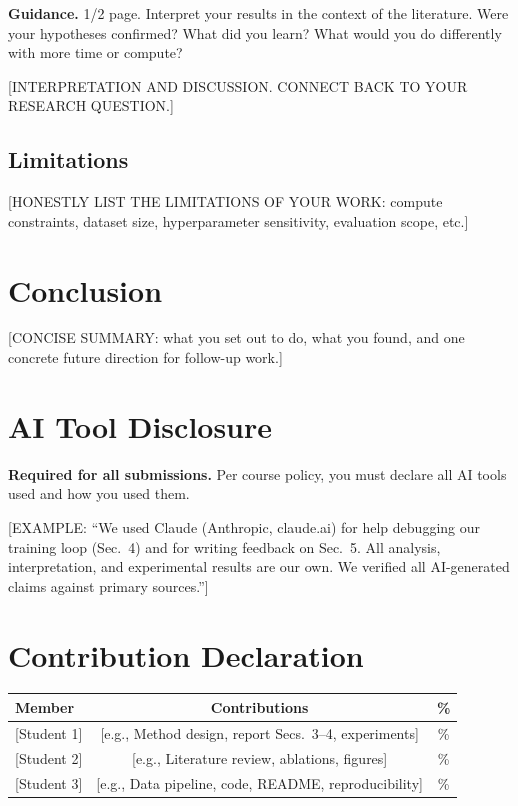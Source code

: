 \documentclass[11pt, letterpaper]{article}
\begin{document}
\begin{guidancebox}
\textbf{Guidance.} 1/2 page. Interpret your results in the context of the
literature. Were your hypotheses confirmed? What did you learn?
What would you do differently with more time or compute?
\end{guidancebox}

[INTERPRETATION AND DISCUSSION. CONNECT BACK TO YOUR RESEARCH QUESTION.]

\subsection{Limitations}

[HONESTLY LIST THE LIMITATIONS OF YOUR WORK: compute constraints, dataset
size, hyperparameter sensitivity, evaluation scope, etc.]

\section{Conclusion}

[CONCISE SUMMARY: what you set out to do, what you found, and one concrete
future direction for follow-up work.]

\section{AI Tool Disclosure}

\begin{guidancebox}
\textbf{Required for all submissions.} Per course policy, you must declare
all AI tools used and how you used them.
\end{guidancebox}

[EXAMPLE: ``We used Claude (Anthropic, claude.ai) for help debugging our
training loop (Sec.~4) and for writing feedback on Sec.~5. All analysis,
interpretation, and experimental results are our own. We verified all
AI-generated claims against primary sources.'']

\section{Contribution Declaration}

\begin{tabular}{lcc}
\toprule
\textbf{Member} & \textbf{Contributions} & \textbf{\%} \\
\midrule
{[Student 1]} & [e.g., Method design, report Secs.~3--4, experiments] & \% \\
{[Student 2]} & [e.g., Literature review, ablations, figures] & \% \\
{[Student 3]} & [e.g., Data pipeline, code, README, reproducibility] & \% \\
\bottomrule
\end{tabular}
\end{document}
